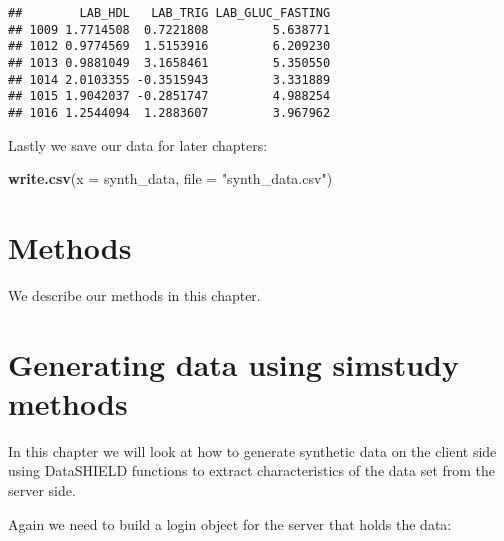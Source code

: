 \documentclass[
]{book}
\newenvironment{Shaded}{\begin{snugshade}}{\end{snugshade}}
\newcommand{\DataTypeTok}[1]{\textcolor[rgb]{0.13,0.29,0.53}{#1}}
\newcommand{\DecValTok}[1]{\textcolor[rgb]{0.00,0.00,0.81}{#1}}
\newcommand{\KeywordTok}[1]{\textcolor[rgb]{0.13,0.29,0.53}{\textbf{#1}}}
\newcommand{\NormalTok}[1]{#1}
\newcommand{\OperatorTok}[1]{\textcolor[rgb]{0.81,0.36,0.00}{\textbf{#1}}}
\newcommand{\StringTok}[1]{\textcolor[rgb]{0.31,0.60,0.02}{#1}}
\begin{document}
\begin{Shaded}
\end{Shaded}

\begin{verbatim}
##        LAB_HDL   LAB_TRIG LAB_GLUC_FASTING
## 1009 1.7714508  0.7221808         5.638771
## 1012 0.9774569  1.5153916         6.209230
## 1013 0.9881049  3.1658461         5.350550
## 1014 2.0103355 -0.3515943         3.331889
## 1015 1.9042037 -0.2851747         4.988254
## 1016 1.2544094  1.2883607         3.967962
\end{verbatim}

Lastly we save our data for later chapters:

\begin{Shaded}
\begin{Highlighting}[]
\KeywordTok{write.csv}\NormalTok{(}\DataTypeTok{x =}\NormalTok{ synth_data, }\DataTypeTok{file =} \StringTok{"synth_data.csv"}\NormalTok{)}
\end{Highlighting}
\end{Shaded}

\hypertarget{methods}{%
\chapter{Methods}\label{methods}}

We describe our methods in this chapter.

\hypertarget{generating-data-using-simstudy-methods}{%
\chapter{Generating data using simstudy methods}\label{generating-data-using-simstudy-methods}}

In this chapter we will look at how to generate synthetic data on the client side using DataSHIELD functions to extract characteristics of the data set from the server side.

Again we need to build a login object for the server that holds the data:
\end{document}
